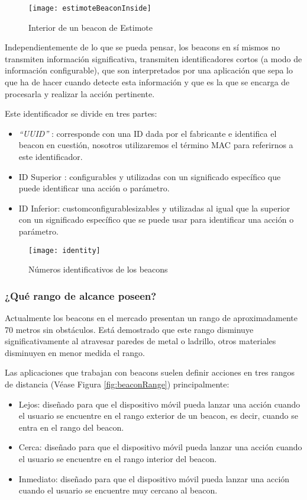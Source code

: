 \begin{figure}[h]
	\centering
	\texttt{[image: estimoteBeaconInside]}
	\caption{Interior de un beacon de Estimote}
	\label{fig:beaconInside}
\end{figure}

Independientemente de lo que se pueda pensar, los beacons en sí mismos no transmiten información significativa, transmiten identificadores cortos (a modo de información configurable), que son interpretados por una aplicación que sepa lo que ha de hacer cuando detecte esta información y que es la que se encarga de procesarla y realizar la acción pertinente.

Este identificador se divide en tres partes: 

\begin{itemize}
\item \textit{"`UUID"'} \cite{URL::UUID} : corresponde con una ID dada por el fabricante e identifica el beacon en cuestión, nosotros utilizaremos el término MAC para referirnos a este identificador. \label{el:mac}
\item ID Superior : configurables y utilizadas con un significado específico que puede identificar una acción o parámetro. 
\item ID Inferior: customconfigurablesizables y utilizadas al igual que la superior con un significado específico que se puede usar para identificar una acción o parámetro.
\end{itemize}

\begin{figure}[h]
	\centering
	\texttt{[image: identity]}
	\caption{Números identificativos de los beacons}
	\label{fig:beaconId}
\end{figure}

\subsubsection{¿Qué rango de alcance poseen?}

Actualmente los beacons en el mercado presentan un rango de aproximadamente 70 metros sin obstáculos. Está demostrado que este rango disminuye significativamente al atravesar paredes de metal o ladrillo, otros materiales disminuyen en menor medida el rango. 

Las aplicaciones que trabajan con beacons suelen definir acciones en tres rangos de distancia (Véase Figura \ref{fig:beaconRange}) principalmente: 

\begin{itemize}
\item Lejos: diseñado para que el dispositivo móvil pueda lanzar una acción cuando el usuario se encuentre en el rango exterior de un beacon, es decir, cuando se entra en el rango del beacon.
\item Cerca: diseñado para que el dispositivo móvil pueda lanzar una acción cuando el usuario se encuentre en el rango interior del beacon. 
\item Inmediato: diseñado para que el dispositivo móvil pueda lanzar una acción cuando el usuario se encuentre muy cercano al beacon.
\end{itemize}

